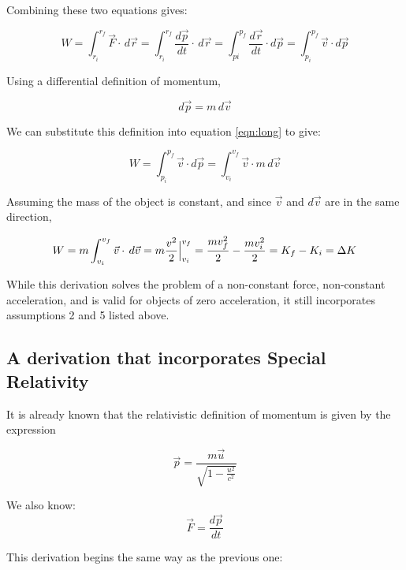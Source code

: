 \documentclass[letterpaper, 12pt]{article}
\begin{document}
Combining these two equations gives: 

\begin{equation}
	W = \int_{r_i}^{r_f} \vec{F} \cdot \,d\vec{r} = \int_{r_i}^{r_f} \frac{d\vec{p}}{dt} \cdot \,d\vec{r} = \int_{pi}^{p_f}  \frac{d\vec{r}}{dt} \cdot d\vec{p} = \int_{p_i}^{p_f} \vec{v} \cdot d\vec{p}  
	\label{eqn:long}
\end{equation}

Using a differential definition of momentum,

\begin{equation}
	d\vec{p} = m \, d\vec{v} 
\end{equation}

We can substitute this definition into equation \ref{eqn:long} to give: 

\begin{equation}
	W = \int_{p_i}^{p_f} \vec{v} \cdot d\vec{p}  = \int_{v_i}^{v_f} \vec{v} \cdot m \, d\vec{v}   
\end{equation}

Assuming the mass of the object is constant, and since $\vec{v}$ and $d\vec{v} $ are in the same direction,  

\begin{equation}
	W = m \int_{v_i}^{v_f} \vec{v} \cdot \, d\vec{v}  = m \frac{v^2}{2} \Big {|}_{v_i}^{v_f} = \frac{mv_f^2}{2} - \frac{mv_i^2}{2} = K_f - K_i = \Delta K
\end{equation}

While this derivation solves the problem of a non-constant force, non-constant acceleration, and is valid for objects of zero acceleration, it still incorporates assumptions 2 and 5 listed above.  


\subsection{A derivation that incorporates Special Relativity}
It is already known that the relativistic definition of momentum is given by the expression

\begin{equation}
	\vec{p} = \frac{m \vec{u}}{\sqrt{1-\frac{u^2}{c^2}}} 
\end{equation}

We also know:
\begin{equation}
	\vec{F} = \frac{d\vec{p}}{dt}
\end{equation}

This derivation begins the same way as the previous one:
\end{document}
